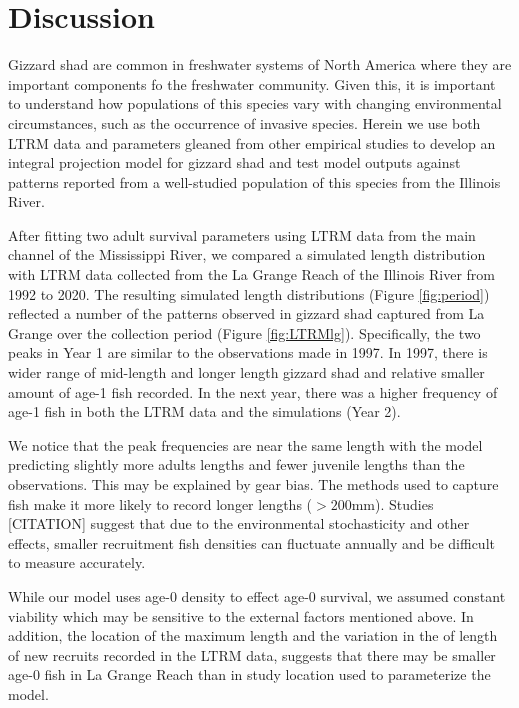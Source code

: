 \documentclass[preprint,review,12pt,authoryear]{elsarticle}
\begin{document}
\section{Discussion}


Gizzard shad are common in freshwater systems of North America where they are important components fo the freshwater community. 
Given this, it is important to understand how populations of this species vary with changing environmental circumstances, such as the occurrence of invasive species. 
Herein we use both LTRM data and parameters gleaned from other empirical studies to develop an integral projection model for gizzard shad and test model outputs against patterns reported from a well-studied population of this species from the Illinois River.   

After fitting two adult survival parameters using LTRM data from the main channel of the Mississippi River, we compared a simulated length distribution with LTRM data collected from the La Grange Reach of the Illinois River from 1992 to 2020. 
The resulting simulated length distributions (Figure \ref{fig:period}) reflected a number of the patterns observed in gizzard shad captured from La Grange over the collection period (Figure \ref{fig:LTRMlg}). 
Specifically, the two peaks in Year 1 are similar to the observations made in 1997.  
In 1997, there is wider range of mid-length and longer length gizzard shad and relative smaller amount of age-1 fish recorded.  
In the next year, there was a higher frequency of age-1 fish in both the LTRM data and the simulations (Year 2).

We notice that the peak frequencies are near the same length with the model predicting slightly more adults lengths and fewer juvenile lengths than the observations. 
This may be explained by gear bias.
The methods used to capture fish make it more likely to record longer lengths ($>200$mm). 
Studies [CITATION] suggest that due to the environmental stochasticity and other effects, smaller recruitment fish densities can fluctuate annually and be difficult to measure accurately. 

While our model uses age-0 density to effect age-0 survival, we assumed constant viability which may be sensitive to the external factors mentioned above.
In addition, the location of the maximum length and the variation in the of length of new recruits recorded in the LTRM data, suggests that there may be smaller age-0 fish in La Grange Reach than in study location \citep{michaletz2017variation} used to parameterize the model.  
\end{document}
